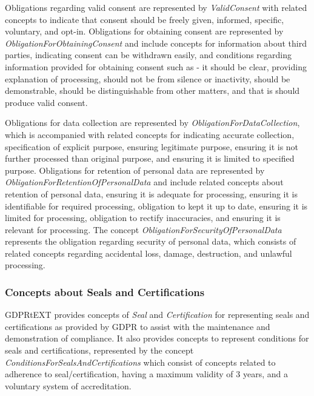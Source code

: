 Obligations regarding valid consent are represented by \textit{ValidConsent} with related concepts to indicate that consent should be freely given, informed, specific, voluntary, and opt-in. 
Obligations for obtaining consent are represented by \textit{ObligationForObtainingConsent} and include concepts for information about third parties, indicating consent can be withdrawn easily, and conditions regarding information provided for obtaining consent such as - it should be clear, providing explanation of processing, should not be from silence or inactivity, should be demonstrable, should be distinguishable from other matters, and that is should produce valid consent.

Obligations for data collection are represented by \textit{ObligationForDataCollection}, which is accompanied with related concepts for indicating accurate collection, specification of explicit purpose, ensuring legitimate purpose, ensuring it is not further processed than original purpose, and ensuring it is limited to specified purpose.
Obligations for retention of personal data are represented by \textit{ObligationForRetentionOfPersonalData} and include related concepts about    retention of personal data, ensuring it is adequate for processing, ensuring it is identifiable for required processing, obligation to kept it up to date, ensuring it is limited for processing, obligation to rectify inaccuracies, and ensuring it is relevant for processing. 
The concept \textit{ObligationForSecurityOfPersonalData} represents the obligation regarding security of personal data, which consists of related concepts regarding accidental loss, damage, destruction, and unlawful processing.

\subsubsection{Concepts about Seals and Certifications}
GDPRtEXT provides concepts of \textit{Seal} and \textit{Certification} for representing seals and certifications as provided by GDPR to assist with the maintenance and demonstration of compliance. It also provides concepts to represent conditions for seals and certifications, represented by the concept \textit{ConditionsForSealsAndCertifications} which consist of concepts related to adherence to seal/certification, having a maximum validity of 3 years, and a voluntary system of accreditation. 

